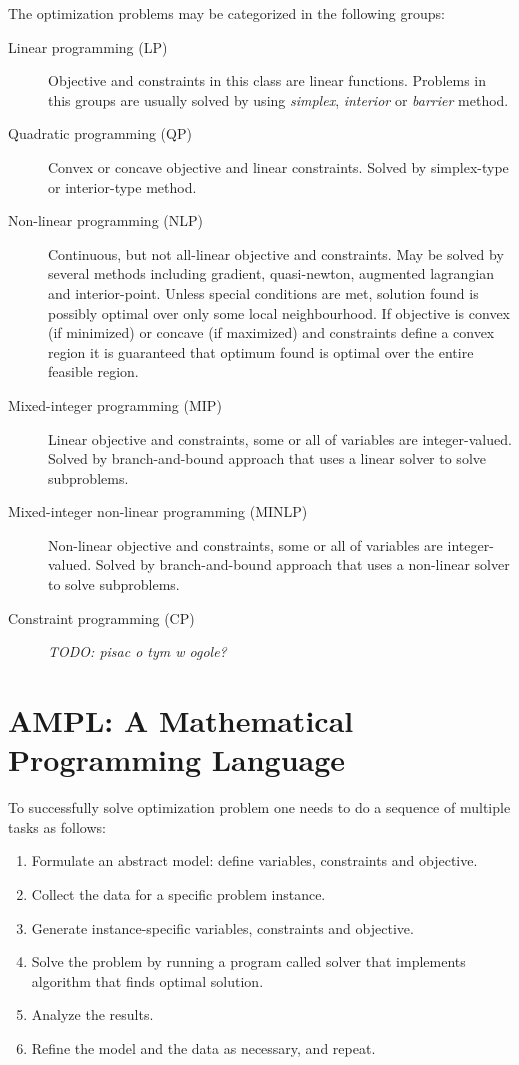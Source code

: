 The optimization problems may be categorized in the following groups:
\begin{description}
  \item[Linear programming (LP)] Objective and constraints in this class are linear functions. Problems in this groups are usually solved by using \emph{simplex}, \emph{interior} or \emph{barrier} method.
  \item[Quadratic programming (QP)] Convex or concave objective and linear constraints. Solved by simplex-type or interior-type method.
  \item[Non-linear programming (NLP)] Continuous, but not all-linear objective and constraints. May be solved by several methods including gradient, quasi-newton, augmented lagrangian and interior-point. Unless special conditions are met, solution found is possibly optimal over only some local neighbourhood. If objective is convex (if minimized) or concave (if maximized) and constraints define a convex region it is guaranteed that optimum found is optimal over the entire feasible region.
  \item[Mixed-integer programming (MIP)] Linear objective and constraints, some or all of variables are integer-valued. Solved by branch-and-bound approach that uses a linear solver to solve subproblems.
  \item[Mixed-integer non-linear programming (MINLP)] Non-linear objective and constraints, some or all of variables are integer-valued. Solved by branch-and-bound approach that uses a non-linear solver to solve subproblems.
  \item[Constraint programming (CP)] \emph{TODO: pisac o tym w ogole?}
\end{description}

\section{AMPL: A Mathematical Programming Language}
\label{sec:ampl:ampl}

To successfully solve optimization problem one needs to do a sequence of multiple tasks as follows:

\begin{enumerate}
  \item Formulate an abstract model: define variables, constraints and objective.
  \item Collect the data for a specific problem instance.
  \item Generate instance-specific variables, constraints and objective.
  \item Solve the problem by running a program called solver that implements algorithm that finds optimal solution.
  \item Analyze the results.
  \item Refine the model and the data as necessary, and repeat.
\end{enumerate}

